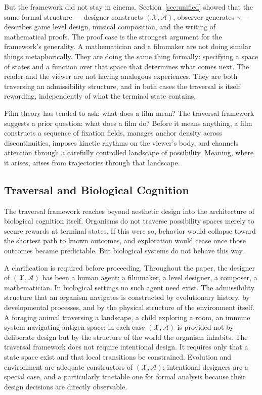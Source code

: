 \documentclass[12pt, a4paper]{article}
\theoremstyle{plain}
\theoremstyle{definition}
\theoremstyle{remark}
\newcommand{\X}{\mathcal{X}}
\newcommand{\A}{\mathcal{A}}
\newcommand{\traj}{\gamma}
\begin{document}
But the framework did not stay in cinema. Section~\ref{sec:unified}
showed that the same formal structure --- designer constructs
$(\X, \A)$, observer generates $\traj$ --- describes game
level design, musical composition, and the writing of
mathematical proofs. The proof case is the strongest
argument for the framework's generality. A mathematician
and a filmmaker are not doing similar things metaphorically.
They are doing the same thing formally: specifying a space
of states and a function over that space that determines
what comes next. The reader and the viewer are not having
analogous experiences. They are both traversing an
admissibility structure, and in both cases the traversal
is itself rewarding, independently of what the terminal
state contains.

Film theory has tended to ask: what does a film mean? The
traversal framework suggests a prior question: what does a
film do? Before it means anything, a film constructs a
sequence of fixation fields, manages anchor density across
discontinuities, imposes kinetic rhythms on the viewer's
body, and channels attention through a carefully controlled
landscape of possibility. Meaning, where it arises, arises
from trajectories through that landscape.

\subsection{Traversal and Biological Cognition}
\label{subsec:biology}

The traversal framework reaches beyond aesthetic design into
the architecture of biological cognition itself. Organisms
do not traverse possibility spaces merely to secure rewards
at terminal states. If this were so, behavior would collapse
toward the shortest path to known outcomes, and exploration
would cease once those outcomes became predictable. But
biological systems do not behave this way.

A clarification is required before proceeding. Throughout
the paper, the designer of $(\X, \A)$ has been a human
agent: a filmmaker, a level designer, a composer, a
mathematician. In biological settings no such agent need
exist. The admissibility structure that an organism
navigates is constructed by evolutionary history, by
developmental processes, and by the physical structure of
the environment itself. A foraging animal traversing a
landscape, a child exploring a room, an immune system
navigating antigen space: in each case $(\X, \A)$ is
provided not by deliberate design but by the structure of
the world the organism inhabits. The traversal framework
does not require intentional design. It requires only that
a state space exist and that local transitions be
constrained. Evolution and environment are adequate
constructors of $(\X, \A)$; intentional designers are a
special case, and a particularly tractable one for formal
analysis because their design decisions are directly
observable.
\end{document}
